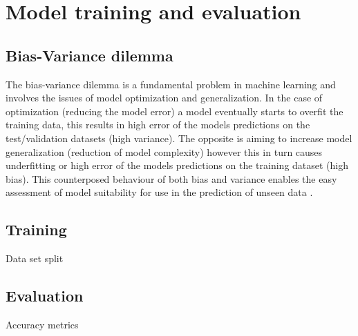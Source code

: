 \section{Model training and evaluation}\label{Model training and evaluation}

\subsection{Bias-Variance dilemma}\label{Bias-Variance dilemma}

The bias-variance dilemma is a fundamental problem in machine learning and involves the issues of model optimization and generalization. In the case of optimization (reducing the model error) a model eventually starts to overfit the training data, this results in high error of the models predictions on the test/validation datasets (high variance). The opposite is aiming to increase model generalization (reduction of model complexity) however this in turn causes underfitting or high error of the models predictions on the training dataset (high bias). This counterposed behaviour of both bias and variance enables the easy assessment of model suitability for use in the prediction of unseen data \cite{ibm-ensemble,ibm-regularization,svm-2}. 

% 
% 


\subsection{Training}\label{Training}

Data set split

\subsection{Evaluation}\label{Evaluation}

Accuracy metrics

